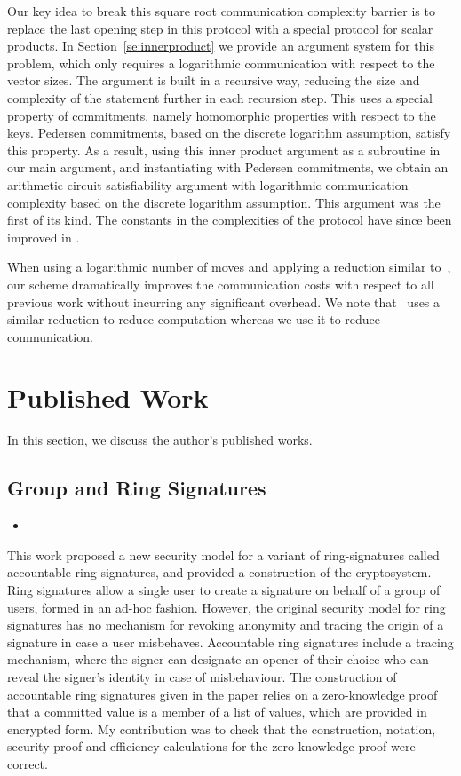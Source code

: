 Our key idea to break this square root communication complexity barrier is to replace the last opening step in this protocol with a special protocol for scalar products. In Section~\ref{se:innerproduct} we provide an argument system for this problem, which only requires a logarithmic communication with respect to the vector sizes. The argument is built in a recursive way, reducing the size and complexity of the statement further in each recursion step. This uses a special property of commitments, namely homomorphic properties with respect to the keys. Pedersen commitments, based on the discrete logarithm assumption, satisfy this property. As a result, using this inner product argument as a subroutine in our main argument, and instantiating with Pedersen commitments, we obtain an arithmetic circuit satisfiability argument with logarithmic communication complexity based on the discrete logarithm assumption. This argument was the first of its kind. The constants in the complexities of the protocol have since been improved in \cite{BunzBBPWM18}.

When using a logarithmic number of moves and applying a reduction similar to~\cite{BG12}, our scheme dramatically improves the communication costs with respect to all previous work without incurring any significant overhead. We note that~\cite{BG12} uses a similar reduction to reduce computation whereas we use it to reduce communication.

\section{Published Work}

In this section, we discuss the author's published works.

\subsection*{Group and Ring Signatures}

\begin{itemize}
\item {}
\end{itemize}

This work proposed a new security model for a variant of ring-signatures called accountable ring signatures, and provided a construction of the cryptosystem. Ring signatures allow a single user to create a signature on behalf of a group of users, formed in an ad-hoc fashion. However, the original security model for ring signatures has no mechanism for revoking anonymity and tracing the origin of a signature in case a user misbehaves. Accountable ring signatures include a tracing mechanism, where the signer can designate an opener of their choice who can reveal the signer's identity in case of misbehaviour. The construction of accountable ring signatures given in the paper relies on a zero-knowledge proof that a committed value is a member of a list of values, which are provided in encrypted form. My contribution was to check that the construction, notation, security proof and efficiency calculations for the zero-knowledge proof were correct.

